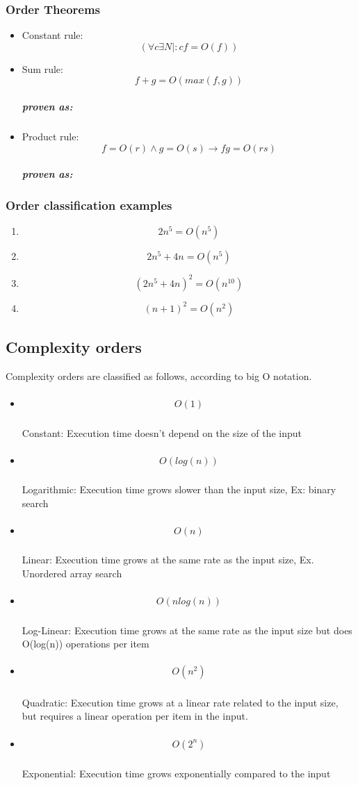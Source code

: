 \documentclass[12pt,a4paper,olive]{bbe}
\begin{document}
	\subsubsection{Order Theorems}
	\begin{itemize}
		\item Constant rule: $$(\forall c  \exists  N | : cf = O(f))$$
		\item {
			Sum rule: $$ f + g = O(max(f,g)) $$
			\subparagraph*{proven as:}
			
			}
		\item {
			Product rule: $$ f = O(r) \land g = O(s) \longrightarrow fg = O(rs) $$
			\subparagraph*{proven as:}
			
			}
	\end{itemize}

	\subsubsection{Order classification examples}
	\begin{enumerate}
		\item $$2n^5 = O(n^5)$$
		\item $$2n^5 + 4n = O(n^5) $$
		\item $$ (2n^5 + 4n)^2 = O(n^{10})$$
		\item $$(n+1)^2 = O(n^2)$$
	\end{enumerate}

	\subsection{Complexity orders}
	Complexity orders are classified as follows, according to big O notation.
	\begin{itemize}
		\item {
			\subparagraph*{$$O(1)$$} 
		Constant: Execution time doesn't depend on the size of the input
		} 
		\item {
			\subparagraph{$$O(log(n))$$}
		Logarithmic: Execution time grows slower than the input size, Ex: binary search
		}
		\item {
			\subparagraph{$$O(n)$$}
		Linear: Execution time grows at the same rate as the input size, Ex. Unordered array search 
		}
		\item {
			\subparagraph{$$O(n log(n))$$}
		Log-Linear: Execution time grows at the same rate as the input size but does O(log(n)) operations per item
		}
		\item {
			\subparagraph{$$O(n^2)$$}
		Quadratic: Execution time grows at a linear rate related to the input size, but requires a linear operation per item in the input.
		}
		\item {
			\subparagraph{$$O(2^n)$$}
		Exponential: Execution time grows exponentially compared to the input
		}
	\end{itemize}
\end{document}
